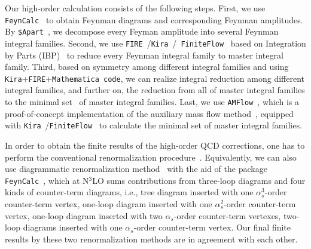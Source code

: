 \documentclass[onecolumn,preprintnumbers,aps,superscriptaddress,nofootinbib,prd,notitlepage]{revtex4-1}
\begin{document}
{Our high-order calculation  consists of the following steps.
First, we use {\texttt{FeynCalc}}~\cite{Shtabovenko:2020gxv}  to obtain Feynman diagrams and corresponding Feynman amplitudes.
By {\texttt{\$Apart}}~\cite{Feng:2012iq}, we decompose  every Feyman amplitude  into several Feynman integral families.
Second, we use {\texttt{FIRE}}~\cite{Smirnov:2019qkx}/{\texttt{Kira}}~\cite{Klappert:2020nbg}/{\texttt{ FiniteFlow}}~\cite{Peraro:2019svx} based on Integration by Parts (IBP)~\cite{Chetyrkin:1981qh}
to reduce every Feynman integral family to master integral family.
Third, based on symmetry among different integral families and using  {\texttt{Kira}}+{\texttt{FIRE}}+{\texttt{Mathematica\,code}}, we can realize  integral reduction among different integral families,
and further on, the reduction from all of master integral families to the minimal set~\cite{Fael:2020njb} of master  integral families.
Last, we use {\texttt{AMFlow}}~\cite{Liu:2022chg}, which is a proof-of-concept implementation of the auxiliary mass flow method~\cite{Liu:2017jxz}, equipped with {\texttt{Kira}}~\cite{Klappert:2020nbg}/{\texttt{FiniteFlow}}~\cite{Peraro:2019svx} to calculate the minimal set of master integral families.

In order to obtain the finite results of  the high-order QCD corrections, one has to perform the  conventional renormalization procedure~\cite{Chen:2015csa,Kniehl:2006qw,Bonciani:2008wf,Davydychev:1997vh}.
Equivalently, we can also use diagrammatic renormalization method~\cite{deOliveira:2022eeq}  with the aid of the package {\texttt{FeynCalc}}~\cite{Shtabovenko:2020gxv},
which at N$^3$LO sums contributions from three-loop diagrams and four  kinds of counter-term diagrams, i.e.,  tree diagram   inserted with one $\alpha_s^3$-order counter-term vertex,
one-loop diagram inserted with one $\alpha_s^2$-order counter-term vertex, one-loop diagram inserted with two $\alpha_s$-order counter-term vertexes,
two-loop diagrams inserted with one $\alpha_s$-order counter-term vertex. Our final finite results by these two renormalization methods are in agreement with each other.



}
\end{document}
